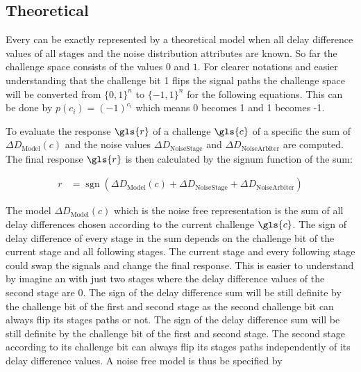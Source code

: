 
\subsection{Theoretical}
\label{sec:theoretical}

Every \apuf can be exactly represented by a theoretical model when all delay difference values of all stages and the noise distribution attributes are known.
So far the challenge space consists of the values $0$ and $1$.
For clearer notations and easier understanding that the challenge bit 1 flips the signal paths the challenge space will be converted from $\{0, 1\}^n$ to $\{-1, 1\}^n$ for the following equations.
This can be done by $p(c_i) = (-1)^{c_i}$ which means 0 becomes 1 and 1 becomes -1.

To evaluate the response $\gls{r}$ of a challenge $\gls{c}$ of a specific \puf the sum of $\Delta D_{\mathrm{Model}}(c)$ and the noise values $\Delta D_{\mathrm{Noise Stage}}$ and $\Delta D_{\mathrm{Noise Arbiter}}$ are computed.
The final response $\gls{r}$ is then calculated by the signum function of the sum:

\begin{align*}
r &= \operatorname{sgn}(\Delta D_{\mathrm{Model}}(c) + \Delta D_{\mathrm{Noise Stage}} + \Delta D_{\mathrm{Noise Arbiter}})
\end{align*}

The model $\Delta D_{\mathrm{Model}}(c)$ which is the noise free \apuf representation is the sum of all delay differences chosen according to the current challenge $\gls{c}$.
The sign of delay difference of every stage in the sum depends on the challenge bit of the current stage and all following stages.
The current stage and every following stage could swap the signals and change the final response.
This is easier to understand by imagine an \apuf with just two stages where the delay difference values of the second stage are 0. 
The sign of the delay difference sum will be still definite by the challenge bit of the first and second stage as the second challenge bit can always flip its stages paths or not.
The sign of the delay difference sum will be still definite by the challenge bit of the first and second stage.
The second stage according to its challenge bit can always flip its stages paths independently of its delay difference values.
A noise free \apuf model is thus be specified by

